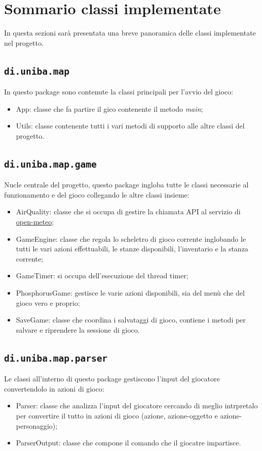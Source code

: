 \documentclass[italian,12pt,a4paper]{article}
\begin{document}
	\section{Sommario classi implementate}
	In questa sezioni sarà presentata una breve panoramica delle classi implementate nel progetto.
	
	\subsection{\texttt{di.uniba.map}}
		In questo package sono contenute la classi principali per l'avvio del gioco:
		
		\begin{itemize}
			\item App: classe che fa partire il gico contenente il metodo \textit{main};
			\item Utils: classe contenente tutti i vari metodi di supporto alle altre classi del progetto.
		\end{itemize}
	
	\subsection{\texttt{di.uniba.map.game}}
		Nucle centrale del progetto, questo package ingloba tutte le classi necessarie al funzionamento e del gioco collegando le altre classi insieme:
		
		\begin{itemize}
			\item AirQuality: classe che si occupa di gestire la chiamata API al servizio di \href{https://open-meteo.com/en/docs/air-quality-api}{open-meteo};
			\item GameEngine: classe che regola lo scheletro di gioco corrente inglobando le tutti le vari azioni effettuabili, le stanze disponibili, l'inventario e la stanza corrente;
			\item GameTimer: si occupa dell'esecuzione del thread timer;
			\item PhosphorusGame: gestisce le varie azioni disponibili, sia del menù che del gioco vero e proprio;
			\item SaveGame: classe che coordina i salvataggi di gioco, contiene i metodi per salvare e riprendere la sessione di gioco.
		\end{itemize}
		
	
	\subsection{\texttt{di.uniba.map.parser}}
	Le classi all'interno di questo package gestiscono l'input del giocatore convertendolo in azioni di gioco:
	\begin{itemize}
		\item Parser: classe che analizza l'input del giocatore cercando di meglio intrpretalo per convertire il tutto in azioni di gioco (azione, azione-oggetto e azione-personaggio);
		\item ParserOutput: classe che compone il comando che il giocatre impartisce.
	\end{itemize}
	
\end{document}
